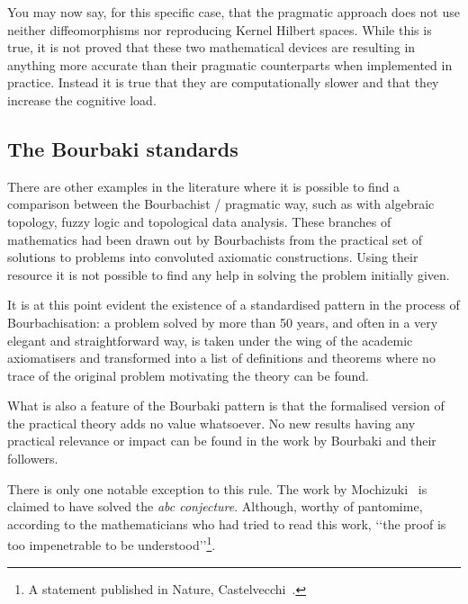 \documentclass[]{scrartcl}
\theoremstyle{definition}
\begin{document}
You may now say, for this specific case, that the pragmatic approach \cite{modersitzki2004numerical} does not use neither diffeomorphisms nor reproducing Kernel Hilbert spaces. While this is true, it is not proved that these two mathematical devices are resulting in anything more accurate than their pragmatic counterparts when implemented in practice. Instead it is true that they are computationally slower and that they increase the cognitive load.


\subsection*{The Bourbaki standards}

There are other examples in the literature where it is possible to find a comparison between the Bourbachist / pragmatic way, such as with algebraic topology, fuzzy logic and topological data analysis. 
These branches of mathematics had been drawn out by Bourbachists from the practical set of solutions to problems into convoluted axiomatic constructions. Using their resource it is not possible to find any help in solving the problem initially given.

It is at this point evident the existence of a standardised pattern in the process of Bourbachisation: a problem solved by more than 50 years, and often in a very elegant and straightforward way, is taken under the wing of the academic axiomatisers and transformed into a list of definitions and theorems where no trace of the original problem motivating the theory can be found.


What is also a feature of the Bourbaki pattern is that the formalised version of the practical theory adds no value whatsoever. No new results having any practical relevance or impact can be found in the work by Bourbaki and their followers.

There is only one notable exception to this rule. The work by Mochizuki~\cite{mochizuki2012inter} is claimed to have solved the \emph{abc conjecture}. Although, worthy of pantomime, according to the mathematicians who had tried to read this work, \lq\lq the proof is too impenetrable to be understood\rq\rq\footnote{A statement published in Nature, Castelvecchi~\cite{castelvecchi2015biggest}.}.
\end{document}
